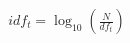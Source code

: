 \documentclass[preview]{standalone}
\begin{document}
\begin{align*}
idf_t=\log_{10}\!\left(\frac{N}{df_t}\right)
\end{align*}
\end{document}
